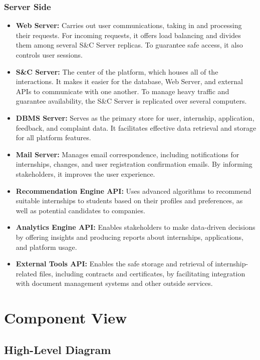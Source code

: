 \subsubsection{Server Side}
\begin{itemize}
    \item \textbf{Web Server:} Carries out user communications, taking in and processing their requests. For incoming requests, it offers load balancing and divides them among several S\&C Server replicas. To guarantee safe access, it also controls user sessions.
    \item \textbf{S\&C Server:} The center of the platform, which houses all of the interactions. It makes it easier for the database, Web Server, and external APIs to communicate with one another. To manage heavy traffic and guarantee availability, the S\&C Server is replicated over several computers.
    \item \textbf{DBMS Server:} Serves as the primary store for user, internship, application, feedback, and complaint data. It facilitates effective data retrieval and storage for all platform features.
    \item \textbf{Mail Server:} Manages email correspondence, including notifications for internships, changes, and user registration confirmation emails. By informing stakeholders, it improves the user experience.
    \item \textbf{Recommendation Engine API:} Uses advanced algorithms to recommend suitable internships to students based on their profiles and preferences, as well as potential candidates to companies.
    \item \textbf{Analytics Engine API:} Enables stakeholders to make data-driven decisions by offering insights and producing reports about internships, applications, and platform usage.
    \item \textbf{External Tools API:} Enables the safe storage and retrieval of internship-related files, including contracts and certificates, by facilitating integration with document management systems and other outside services.
\end{itemize}

\section{Component View}
\label{subsec:component_view}

\subsection{High-Level Diagram}
\label{subsubsec:high_level_diagram}

